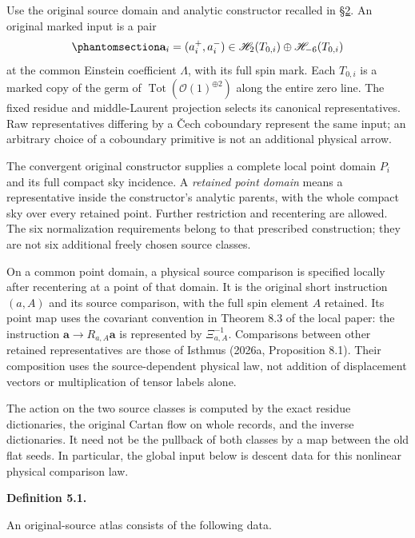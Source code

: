 \documentclass[
  english,
  11pt,
  reqno]{amsart}
\makeatletter
\newcommand{\pandocstatementheading}[1]{%
  \par\addpenalty{\@beginparpenalty}%
  \addvspace{.5\baselineskip plus .2\baselineskip minus .2\baselineskip}%
  {\normalfont\bfseries #1\par}%
  \nobreak\@afterindenttrue\@afterheading
}
\makeatother
\begin{document}
Use the original source domain and analytic constructor recalled in
\hyperref[sec:local-input-v08]{§2}. An original marked input is a pair
\begin{equation}\protect\phantomsection\label{eq:atlas-original-source-pairs}{
\mathbf a_i=(a_i^+,a_i^-)
\in\mathscr H_2(T_{0,i})\oplus\mathscr H_{-6}(T_{0,i})
}\end{equation} at the common Einstein coefficient \(\Lambda\), with its
full spin mark. Each \(T_{0,i}\) is a marked copy of the germ of
\(\operatorname{Tot}(\mathcal O(1)^{\oplus2})\) along the entire zero
line. The fixed residue and middle-Laurent projection selects its
canonical representatives. Raw representatives differing by a Čech
coboundary represent the same input; an arbitrary choice of a coboundary
primitive is not an additional physical arrow.

The convergent original constructor supplies a complete local point
domain \(P_i\) and its full compact sky incidence. A \emph{retained
point domain} means a representative inside the constructor's analytic
parents, with the whole compact sky over every retained point. Further
restriction and recentering are allowed. The six normalization
requirements belong to that prescribed construction; they are not six
additional freely chosen source classes.

On a common point domain, a physical source comparison is specified
locally after recentering at a point of that domain. It is the original
short instruction \((a,A)\) and its source comparison, with the full
spin element \(A\) retained. Its point map uses the covariant convention
in Theorem 8.3 of the local paper: the instruction
\(\mathbf a\to R_{a,A}\mathbf a\) is represented by \(\Xi_{a,A}^{-1}\).
Comparisons between other retained representatives are those of Isthmus
(2026a, Proposition 8.1). Their composition uses the source-dependent
physical law, not addition of displacement vectors or multiplication of
tensor labels alone.

The action on the two source classes is computed by the exact residue
dictionaries, the original Cartan flow on whole records, and the inverse
dictionaries. It need not be the pullback of both classes by a map
between the old flat seeds. In particular, the global input below is
descent data for this nonlinear physical comparison law.

\pandocstatementheading{\protect{}\label{def:independent-original-source-atlas}Definition 5.1.}

An original-source atlas consists of the following data.
\end{document}
